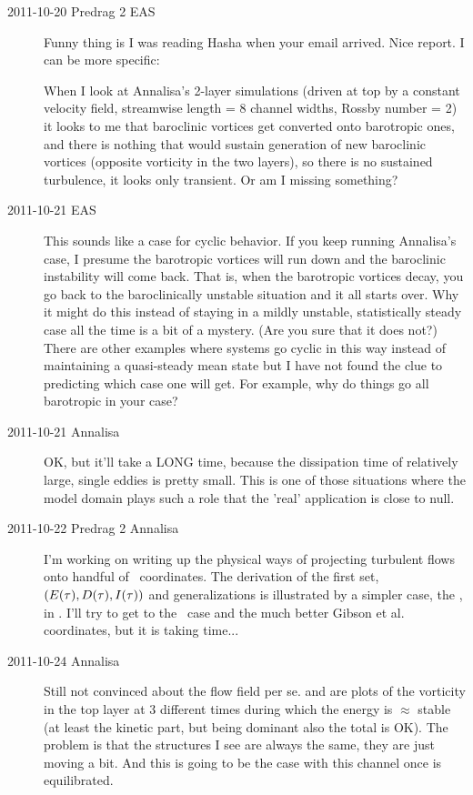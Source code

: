 \begin{description}
\item[2011-10-20 Predrag 2 EAS]
Funny thing is I was reading Hasha when your email arrived. Nice report.
I can be more specific:

When I look at Annalisa's 2-layer simulations (driven at top by a
constant velocity field, streamwise length = 8 channel widths, Rossby
number = 2) it looks to me that baroclinic vortices get converted onto
barotropic ones, and there is nothing that would sustain generation of
new baroclinic vortices (opposite vorticity in the two layers), so there
is no sustained turbulence, it looks only transient. Or am I missing
something?

\item[2011-10-21 EAS]
This sounds like a case for cyclic behavior. If you keep running
Annalisa's case, I presume the barotropic vortices will run down and the
baroclinic instability will come back. That is, when the barotropic
vortices decay, you go back to the baroclinically unstable situation and
it all starts over.   Why it might do this instead of staying in a mildly
unstable, statistically steady case all the time is a bit of a mystery.
(Are you sure that it does not?)   There are other examples where systems
go cyclic in this way instead of maintaining a quasi-steady mean state
but I have not found the clue to predicting which case one will get.  For
example, why do things go all barotropic in your case?

\item[2011-10-21 Annalisa]
OK, but it'll take a LONG time, because the dissipation time of
relatively large, single eddies is pretty small. This is one of those
situations where the model domain plays such a role that the 'real'
application is close to null.

\item[2011-10-22 Predrag 2 Annalisa] I'm working on writing up
the physical ways of projecting turbulent flows onto handful of
\statesp\ coordinates. The derivation of the first set,
$(E(\tau),D(\tau),I(\tau))$ and generalizations is illustrated by
a simpler case, the \KSe, in . I'll try to get to
the \NS\ case and the much better Gibson et al. coordinates, but it
is taking time...

\item[2011-10-24 Annalisa]
Still not convinced about the flow field per se. 
and
are plots of the vorticity in the top layer at 3 different times during
which the energy is $\approx$ stable (at least the kinetic part, but
being dominant also the total is OK). The problem is that the structures I
see are always the same, they are just moving a bit. And this is going to
be the case with this channel once is equilibrated.


\end{description}

